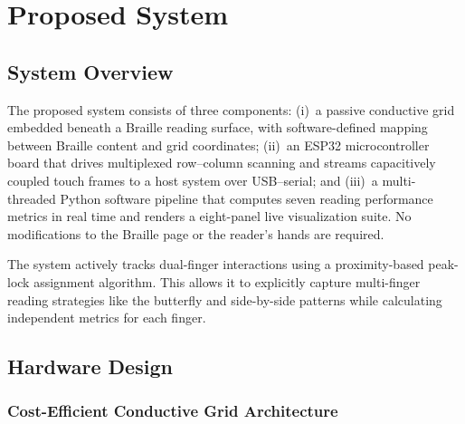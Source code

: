 \documentclass[conference]{IEEEtran}
\begin{document}
    \section{Proposed System}
    \label{sec:solution}

    \subsection{System Overview}

    The proposed system consists of three components:
    (i)~a passive conductive grid embedded beneath a Braille reading
    surface, with software-defined mapping between Braille content and
    grid coordinates;
    (ii)~an ESP32 microcontroller board that drives multiplexed
    row--column scanning and streams capacitively coupled touch frames to
    a host system over USB--serial; and 
    (iii)~a multi-threaded Python
    software pipeline that computes seven reading performance metrics in
    real time and renders a eight-panel live visualization suite. No
    modifications to the Braille page or the reader's hands are required.

    The system actively tracks dual-finger interactions using a proximity-based peak-lock assignment algorithm. This allows it to explicitly capture multi-finger reading strategies like the butterfly and side-by-side patterns while calculating independent metrics for each finger.

    \subsection{Hardware Design}

\subsubsection{Cost-Efficient Conductive Grid Architecture}
\end{document}

